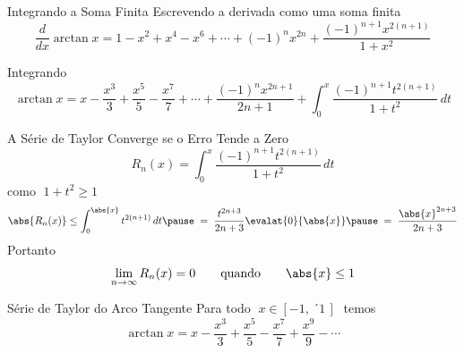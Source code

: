 \begin{frame}{Integrando a Soma Finita}
  Escrevendo a derivada como uma soma finita
  \[
    \frac{d}{dx} \arctan x = 1 - x^2 + x^4 - x^6
                           + \cdots
                           + (-1)^n x^{2n}
                           + \frac{(-1)^{n+1} x^{2(n+1)}}{1+x^2}
  \]

  \pause
  \vspace{0.5\baselineskip}
  Integrando
  \[
    \arctan x = x - \frac{x^3}{3}
                  + \frac{x^5}{5}
                  - \frac{x^7}{7}
                  + \cdots
                  + \frac{(-1)^n x^{2n+1}}{2n+1}
                  + \int_0^x \frac{(-1)^{n+1} t^{2(n+1)}}{1+t^2} \,dt
  \]
\end{frame}

\begin{frame}{A Série de Taylor Converge se o Erro Tende a Zero}
  \[
    R_n(x) = \int_0^x \frac{(-1)^{n+1} t^{2(n+1)}}{1+t^2} \,dt
  \]
  \pause
  como \(\;1+t^2\geq 1\;\)
  \[
    \abs{R_n(x)} \leq \int_0^{\abs{x}} t^{2(n+1)} \,dt \pause
      \; = \; \frac{t^{2n+3}}{2n+3}\evalat{0}{\abs{x}} \pause
      \; = \; \frac{\abs{x}^{2n+3}}{2n+3}
  \]
  \pause
  Portanto
  \[
    \lim_{n\to\infty} R_n(x) = 0 \qquad\text{quando}\qquad \abs{x} \leq 1
  \]
\end{frame}

\begin{frame}{Série de Taylor do Arco Tangente}
  Para todo \(\;x\in[-1,\,´1\,]\;\) temos
  \[
    \arctan x = x - \frac{x^3}{3}
                  + \frac{x^5}{5}
                  - \frac{x^7}{7}
                  + \frac{x^9}{9}
                  - \cdots
  \]
\end{frame}

\begin{frame}{\mytitle}
  \tableofcontents
\end{frame}


